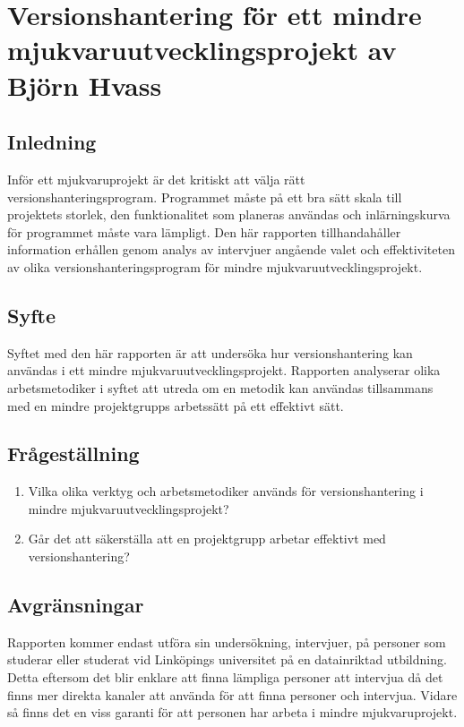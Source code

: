 \chapter{Versionshantering för ett mindre mjukvaruutvecklingsprojekt av Björn Hvass}


%
%
%
%
%
%
%
%
%
%
%

\vspace{3em}
\section{Inledning}
Inför ett mjukvaruprojekt är det kritiskt att välja rätt versionshanteringsprogram. Programmet måste på ett bra sätt skala till projektets storlek, den funktionalitet som planeras användas och inlärningskurva för programmet måste vara lämpligt. Den här rapporten tillhandahåller information erhållen genom analys av intervjuer angående valet och effektiviteten av olika versionshanteringsprogram för mindre mjukvaruutvecklingsprojekt.

\section{Syfte}
Syftet med den här rapporten är att undersöka hur versionshantering kan användas i ett mindre mjukvaruutvecklingsprojekt. Rapporten analyserar olika arbetsmetodiker i syftet att utreda om en metodik kan användas tillsammans med en mindre projektgrupps arbetssätt på ett effektivt sätt.

\section{Frågeställning}
\begin{enumerate}
    \item Vilka olika verktyg och arbetsmetodiker används för versionshantering i mindre mjukvaruutvecklingsprojekt?
    \item Går det att säkerställa att en projektgrupp arbetar effektivt med versionshantering?
\end{enumerate}

\section{Avgränsningar}
Rapporten kommer endast utföra sin undersökning, intervjuer, på personer som studerar eller studerat vid Linköpings universitet på en datainriktad utbildning. Detta eftersom det blir enklare att finna lämpliga personer att intervjua då det finns mer direkta kanaler att använda för att finna personer och intervjua. Vidare så finns det en viss garanti för att personen har arbeta i mindre mjukvaruprojekt.

